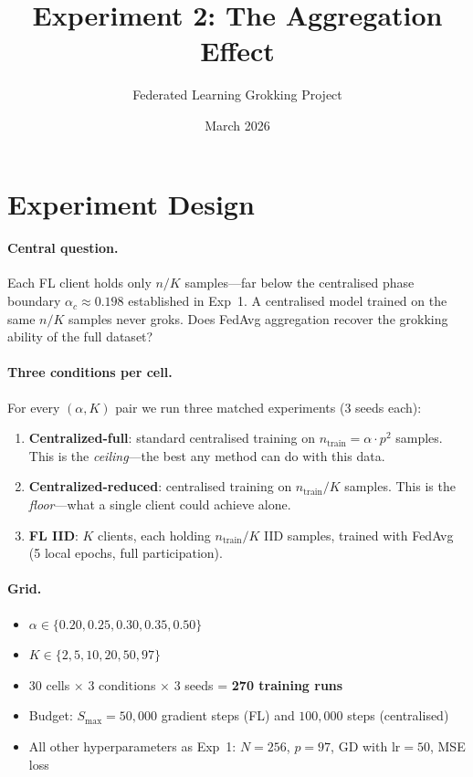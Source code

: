 \documentclass[11pt]{article}
\title{Experiment 2: The Aggregation Effect}
\author{Federated Learning Grokking Project}
\date{March 2026}
\begin{document}
\maketitle

\section{Experiment Design}

\paragraph{Central question.}
Each FL client holds only $n/K$ samples---far below the centralised phase
boundary $\alpha_c \approx 0.198$ established in Exp~1.
A centralised model trained on the same $n/K$ samples never groks.
Does FedAvg aggregation recover the grokking ability of the full dataset?

\paragraph{Three conditions per cell.}
For every $(\alpha, K)$ pair we run three matched experiments (3 seeds each):
\begin{enumerate}[nosep]
  \item \textbf{Centralized-full}: standard centralised training on $n_{\text{train}} = \alpha \cdot p^2$ samples.
        This is the \emph{ceiling}---the best any method can do with this data.
  \item \textbf{Centralized-reduced}: centralised training on $n_{\text{train}}/K$ samples.
        This is the \emph{floor}---what a single client could achieve alone.
  \item \textbf{FL IID}: $K$ clients, each holding $n_{\text{train}}/K$ IID samples,
        trained with FedAvg (5 local epochs, full participation).
\end{enumerate}

\paragraph{Grid.}
\begin{itemize}[nosep]
  \item $\alpha \in \{0.20, 0.25, 0.30, 0.35, 0.50\}$
  \item $K \in \{2, 5, 10, 20, 50, 97\}$
  \item 30 cells $\times$ 3 conditions $\times$ 3 seeds = \textbf{270 training runs}
  \item Budget: $S_{\max} = 50{,}000$ gradient steps (FL) and $100{,}000$ steps (centralised)
  \item All other hyperparameters as Exp~1: $N = 256$, $p = 97$, GD with $\text{lr} = 50$, MSE loss
\end{itemize}
\end{document}
